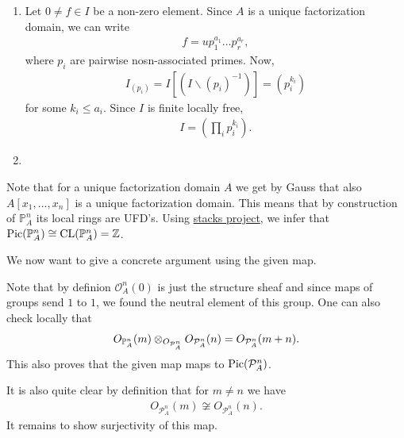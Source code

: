 \newcommand{\sheet}{8}




\maketitle{}

\begin{exercise}{1}
    \begin{enumerate}
        \item  Let $0\not = f \in I$ be a non-zero element. Since $A$ is a
            unique factorization domain, we can write 
            \begin{align*}
                f=u{p}_1^{a_1}\dots {p}_r^{a_r},
            \end{align*}
            where ${p}_i$ are pairwise nosn-associated primes. Now, 
            \begin{align*}
                I_({p}_i)=I[(I\backslash (p_i)^{-1})]=(p_i^{k_i})
            \end{align*}
            for some $k_i\leq a_i$.
            Since $I$ is finite locally free, 
            \begin{align*}
                I=(\prod_i p_i^{k_i}).
            \end{align*}
        \item 
    \end{enumerate}
\end{exercise}

\begin{exercise}{2}
    Note that for a unique factorization domain $A$ we get by Gauss that also
    $A[x_1,\dots, x_n]$ is a unique factorization domain. This means that by
    construction of $\mathbb{P}_A^n$ its local rings are UFD's. Using
    \href{https://stacks.math.columbia.edu/tag/0BE9}{stacks project}, we infer
    that $\operatorname{Pic}(\mathbb{P}_A^n)\cong \operatorname{CL}(\mathbb{P}_A^n)=\mathbb{Z}$.

    We now want to give a concrete argument using the given map.

    Note that by definion $\mathcal{O}^n_A(0)$ is just the structure sheaf and
    since maps of groups send $1$ to $1$, we found the neutral element of this
    group. One can also check locally that 
    \begin{align*}
       O_{\mathbb{P}^n_A}(m)\otimes_{O_{\mathcal{P}^n_A}} O_{\mathcal{P}^n_A}(n) =
        O_{\mathcal{P}^n_A}(m+n).
    \end{align*}
    This also proves that the given map maps to $\operatorname{Pic}(\mathcal{P}^n_A)$.

    It is also quite clear by definition that for $m\not=n$ we have
    \begin{align}
        O_{\mathcal{P}^n_A}(m)\not \cong O_{\mathcal{P}^n_A}(n).
    \end{align}
    It remains to show surjectivity of this map.
\end{exercise}

